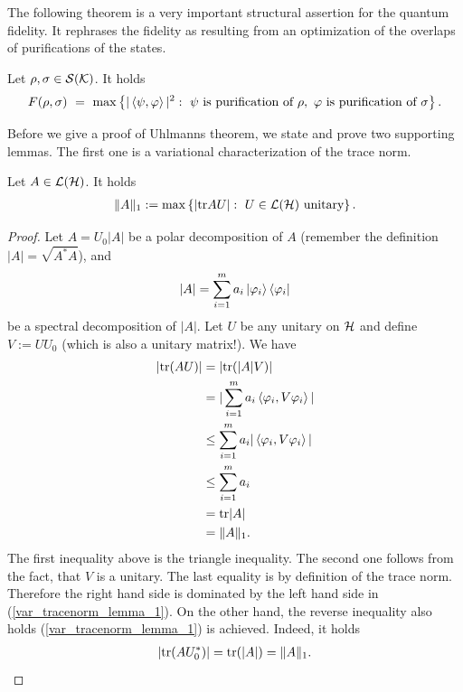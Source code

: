 The following theorem is a very important structural assertion for the quantum fidelity. It rephrases the fidelity as resulting from an optimization of the overlaps of purifications of the states. 
\begin{theorem} \label{theorem:uhlmanns_thm} 
Let $\rho, \sigma \in {\mathcal S}({\mathcal K})$. It holds 
\begin{align}
F(\rho, \sigma) \ = \ \max\left\{|\braket{\psi, \varphi}|^2: \ \psi \ \text{is purification of}\ \rho, \ \varphi \ \text{is purification of} \ \sigma \right\}.
\label{theorem:uhlmanns_thm_eq}
\end{align}
\end{theorem}
Before we give a proof of Uhlmanns theorem, we state and prove two supporting lemmas. The first one is a variational characterization of the trace norm. 
\begin{lemma} \label{lemma:tracenorm_variation}
 Let $A \in {\mathcal L}({\mathcal H})$. It holds
 \begin{align}
  \|A\|_1 := \max \left\{|\mathrm{tr} AU|: \ U \in {\mathcal L}({\mathcal H}) \ \text{unitary} \right\}. \label{var_tracenorm_lemma_1}
 \end{align}
\end{lemma}
\begin{proof}
 Let 
  $
  A = U_0|A|
  $
 be a polar decomposition of $A$ (remember the definition $|A| = \sqrt{A^\ast A}$), and 
 \begin{align*}
  |A| = \sum_{i=1}^m a_i \ket{\varphi_i}\bra{\varphi_i}
 \end{align*}
 be a spectral decomposition of $|A|$. Let $U$ be any unitary on ${\mathcal H}$ and define $V:= UU_0$ (which is also a unitary matrix!). We have
 \begin{align*}
  |\mathrm{tr}(AU)| 
  & = |\mathrm{tr}(|A|V)|  \\
  & = |\sum_{i=1}^m a_i \braket{\varphi_i, V \varphi_i}| \\
  & \leq \sum_{i=1}^m a_i |\braket{\varphi_i, V \varphi_i}| \\
  & \leq \sum_{i=1}^m a_i \\
  & = \mathrm{tr}|A| \\
  &= \|A\|_1.
 \end{align*}
  The first inequality above is the triangle inequality. The second one follows from the fact, that $V$ is a unitary. The last equality is by definition of the trace norm. Therefore the right hand side is dominated by the left hand side in (\ref{var_tracenorm_lemma_1}). On the other hand, the reverse inequality also holds (\ref{var_tracenorm_lemma_1}) is achieved. Indeed, it holds
 \begin{align*}
  |\mathrm{tr}(AU_0^\ast)| = \mathrm{tr}(|A|) = \|A\|_1.
 \end{align*}
\end{proof} 
